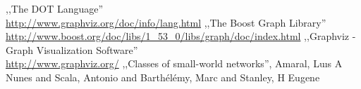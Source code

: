 \documentclass[a4paper, 12pt]{article}
\begin{document}
\begin{thebibliography}{}
 ,,The DOT Language'' \\ \url{http://www.graphviz.org/doc/info/lang.html}
 ,,The Boost Graph Library'' \\ \url{http://www.boost.org/doc/libs/1_53_0/libs/graph/doc/index.html}
 ,,Graphviz - Graph Visualization Software'' \\ \url{http://www.graphviz.org/}
 ,,Classes of small-world networks'', Amaral, Lu{\i}s A Nunes and Scala, Antonio and Barth{\'e}l{\'e}my, Marc and Stanley, H Eugene
\end{thebibliography}
\end{document}
